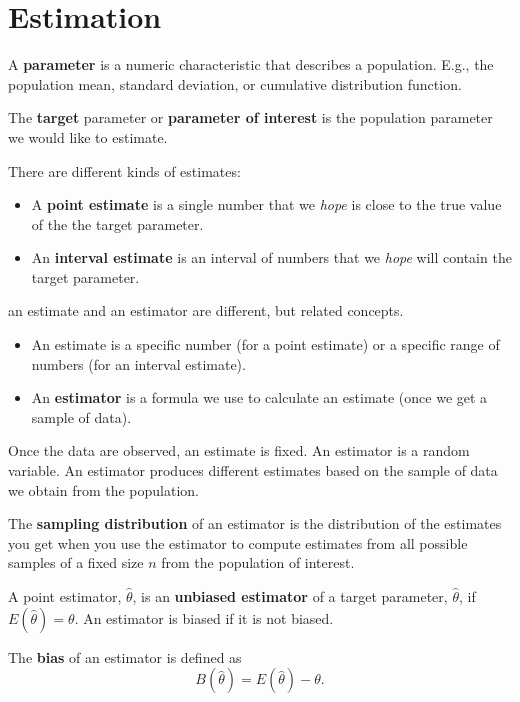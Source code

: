 \documentclass[
]{book}
\providecommand{\tightlist}{%
  \setlength{\itemsep}{0pt}\setlength{\parskip}{0pt}}
\theoremstyle{definition}
\theoremstyle{definition}
\theoremstyle{definition}
\theoremstyle{definition}
\theoremstyle{remark}
\begin{document}
\hypertarget{estimation}{%
\section{Estimation}\label{estimation}}

A \textbf{parameter} is a numeric characteristic that describes a population. E.g., the population mean, standard deviation, or cumulative distribution function.

The \textbf{target} parameter or \textbf{parameter of interest} is the population parameter we would like to estimate.

There are different kinds of estimates:

\begin{itemize}
\tightlist
\item
  A \textbf{point estimate} is a single number that we \emph{hope} is close to the true value of the the target parameter.
\item
  An \textbf{interval estimate} is an interval of numbers that we \emph{hope} will contain the target parameter.
\end{itemize}

an estimate and an estimator are different, but related concepts.

\begin{itemize}
\tightlist
\item
  An estimate is a specific number (for a point estimate) or a specific range of numbers (for an interval estimate).
\item
  An \textbf{estimator} is a formula we use to calculate an estimate (once we get a sample of data).
\end{itemize}

Once the data are observed, an estimate is fixed. An estimator is a random variable. An estimator produces different estimates based on the sample of data we obtain from the population.

The \textbf{sampling distribution} of an estimator is the distribution of the estimates you get when you use the estimator to compute estimates from all possible samples of a fixed size \(n\) from the population of interest.

A point estimator, \(\hat{\theta}\), is an \textbf{unbiased estimator} of a target parameter, \(\hat{\theta}\), if \(E(\hat{\theta})=\theta\). An estimator is biased if it is not biased.

The \textbf{bias} of an estimator is defined as
\[
B(\hat{\theta})=E(\hat{\theta})-\theta.
\]
\end{document}
